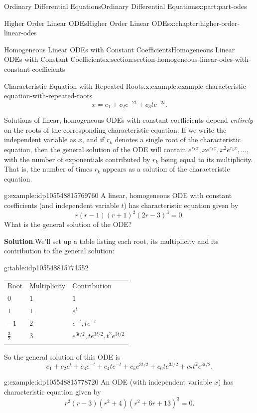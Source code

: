 \documentclass[twoside,10pt,]{book}
\newcommand{\blocktitlefont}{\relax}
\newcommand{\tabularfont}{\relax}
\numberwithin{equation}{part}
\newcommand{\hrulethick} {\noalign{\hrule height 0.11em}}
\begin{document}
\begin{partptx}{Ordinary Differential Equations}{}{Ordinary Differential Equations}{}{}{x:part:part-odes}
\begin{chapterptx}{Higher Order Linear ODEs}{}{Higher Order Linear ODEs}{}{}{x:chapter:higher-order-linear-odes}
\begin{sectionptx}{Homogeneous Linear ODEs with Constant Coefficients}{}{Homogeneous Linear ODEs with Constant Coefficients}{}{}{x:section:section-homogeneous-linear-odes-with-constant-coefficients}
\begin{example}{Characteristic Equation with Repeated Roots.}{x:example:example-characteristic-equation-with-repeated-roots}
\begin{equation*}
x = c_{1}+c_{2}e^{-2t}+c_{3}te^{-2t}.
\end{equation*}
%
\end{example}
Solutions of linear, homogeneous ODEs with constant coefficients depend \emph{entirely} on the roots of the corresponding characteristic equation. If we write the independent variable as \(x\), and if \(r_{k}\) denotes a single root of the characteristic equation, then the general solution of the ODE will contain \(e^{r_{k}x},xe^{r_{k}x},x^{2}e^{r_{k}x},\dots\), with the number of exponentials contributed by \(r_{k}\) being equal to its multiplicity. That is, the number of times \(r_{k}\) appears as a solution of the characteristic equation.%
\begin{example}{}{g:example:idp105548815769760}%
A linear, homogeneous ODE with constant coefficients (and independent variable \(t\)) has characteristic equation given by%
\begin{equation*}
r(r-1)(r+1)^{2}(2r-3)^{3} = 0.
\end{equation*}
What is the general solution of the ODE?%
\par\smallskip%
\noindent\textbf{\blocktitlefont Solution}.\hypertarget{g:solution:idp105548815771040}{}\quad{}We'll set up a table listing each root, its multiplicity and its contribution to the general solution:%
\begin{tableptx}{\textbf{}}{g:table:idp105548815771552}{}%
\centering%
{\tabularfont%
\begin{tabular}{lll}\hrulethick
Root&Multiplicity&Contribution\tabularnewline\hrulethick
\(0\)&\(1\)&\(1\)\tabularnewline\hrulethick
\(1\)&\(1\)&\(e^{t}\)\tabularnewline\hrulethick
\(-1\)&\(2\)&\(e^{-t},te^{-t}\)\tabularnewline\hrulethick
\(\frac{3}{2}\)&\(3\)&\(e^{3t/2},te^{3t/2},t^{2}e^{3t/2}\)\tabularnewline\hrulethick
\end{tabular}
}%
\end{tableptx}%
 So the general solution of this ODE is%
\begin{equation*}
c_{1}+c_{2}e^{t}+c_{3}e^{-t}+c_{4}te^{-t}+c_{5}e^{3t/2}+c_{6}te^{3t/2}+c_{7}t^{2}e^{3t/2}.
\end{equation*}
\end{example}
\begin{example}{}{g:example:idp105548815778720}%
An ODE (with independent variable \(x\)) has characteristic equation given by%
\begin{equation*}
r^{2}(r-3)(r^{2}+4)(r^{2}+6r+13)^{3}=0.
\end{equation*}

\end{example}
\end{sectionptx}
\end{chapterptx}
\end{partptx}
\end{document}
